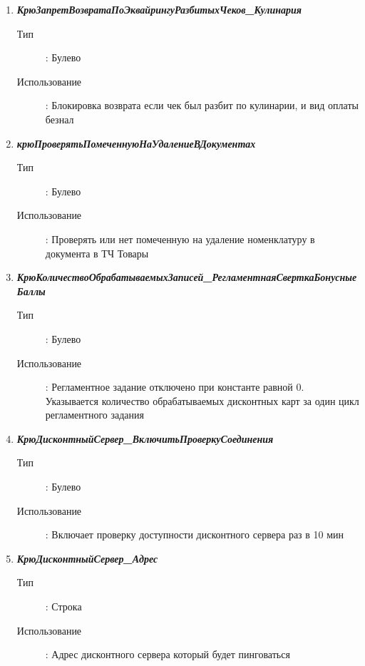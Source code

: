 \begin{enumerate}[label=(\arabic*)]
\vspace{\baselineskip}
\item \textbf{\textit{КрюЗапретВозвратаПоЭквайрингуРазбитыхЧеков\_Кулинария}}
\begin{description}
    \item[Тип] : Булево
    \item[Использование]: Блокировка возврата если чек был разбит по кулинарии, и вид оплаты безнал
\end{description}


\vspace{\baselineskip}
\item \textbf{\textit{крюПроверятьПомеченнуюНаУдалениеВДокументах}}
\begin{description}
    \item[Тип] : Булево
    \item[Использование]: Проверять или нет помеченную на удаление номенклатуру в документа в ТЧ Товары
\end{description}


\vspace{\baselineskip}
\item \textbf{\textit{КрюКоличествоОбрабатываемыхЗаписей\_РегламентнаяСверткаБонусныеБаллы}}
\begin{description}
    \item[Тип] : Булево
    \item[Использование]: Регламентное задание отключено при константе равной 0.
    Указывается количество обрабатываемых дисконтных карт за один цикл регламентного задания
\end{description}

\vspace{\baselineskip}
\item \textbf{\textit{КрюДисконтныйСервер\_ВключитьПроверкуСоединения}}
\begin{description}
    \item[Тип] : Булево
    \item[Использование]: Включает проверку доступности дисконтного сервера раз в 10 мин
\end{description}

\vspace{\baselineskip}
\item \textbf{\textit{КрюДисконтныйСервер\_Адрес}}
\begin{description}
    \item[Тип] : Строка
    \item[Использование]: Адрес дисконтного сервера который будет пинговаться
\end{description}


\end{enumerate}
